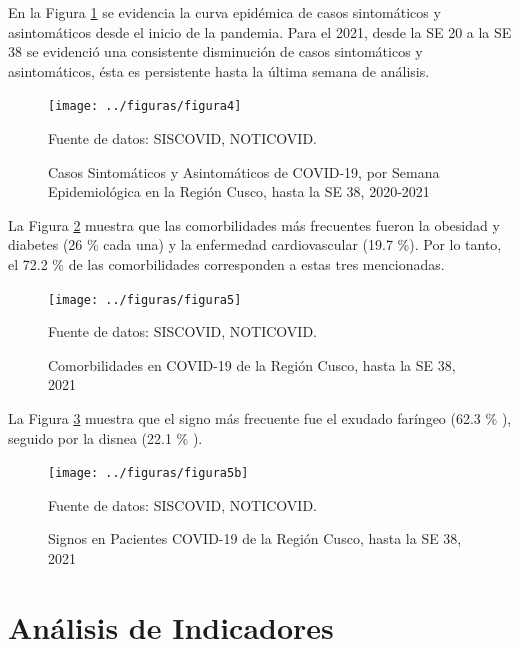 \documentclass[12pt,a4paper,openany]{book}
\begin{document}
	En la Figura \ref{fig:sintomaticos_asintomati} se evidencia la curva epidémica de casos sintomáticos y asintomáticos desde el inicio de la pandemia. Para el 2021, desde la SE 20 a la SE 38 se evidenció una consistente disminución de casos sintomáticos y asintomáticos, ésta es persistente hasta la última semana de análisis.
	\medskip
	
	\begin{figure}[h]
	\caption{Casos Sintomáticos y Asintomáticos de COVID-19, por Semana Epidemiológica en la Región Cusco, hasta la SE 38, 2020-2021  }\label{fig:sintomaticos_asintomati}
	\begin{center}
		\texttt{[image: ../figuras/figura4]}
	\end{center}
	{\footnotesize {Fuente de datos: SISCOVID, NOTICOVID.}}
	\end{figure}


	La Figura \ref{fig:comorbilidades} muestra que las comorbilidades más frecuentes fueron la obesidad y diabetes (26 $\%$ cada una) y la enfermedad cardiovascular (19.7 $\%$). Por lo tanto, el 72.2 $\%$ de las comorbilidades corresponden a estas tres mencionadas.
	
	\begin{figure}[h]
	\caption{Comorbilidades en COVID-19 de la Región Cusco, hasta la SE 38, 2021}\label{fig:comorbilidades}
	\begin{center}
		\texttt{[image: ../figuras/figura5]}
	\end{center}
	{\footnotesize {Fuente de datos: SISCOVID, NOTICOVID.}}
	\end{figure}

	La Figura \ref{fig:sign} muestra que el signo más frecuente fue el exudado faríngeo (62.3 $\%$ ), seguido por la disnea (22.1 $\%$ ).
	
	\begin{figure}[h]
	\caption{Signos en Pacientes COVID-19 de la Región Cusco, hasta la SE 38, 2021}\label{fig:sign}
	\begin{center}
		\texttt{[image: ../figuras/figura5b]}
	\end{center}{\footnotesize {Fuente de datos: SISCOVID, NOTICOVID.}}
	\end{figure}

    \chapter*{Análisis de Indicadores}
   
\end{document}
